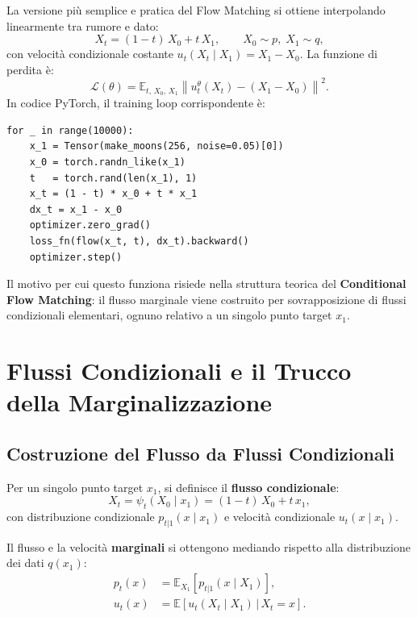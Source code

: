 La versione più semplice e pratica del Flow Matching si ottiene
interpolando linearmente tra rumore e dato:
\begin{equation}
  X_t = (1-t)\,X_0 + t\,X_1, \qquad X_0 \sim p,\; X_1 \sim q,
  \label{eq:fm-linear-interp}
\end{equation}
con velocità condizionale costante $u_t(X_t \mid X_1) = X_1 - X_0$.
La funzione di perdita è:
\begin{equation}
  \mathcal{L}(\theta) = \mathbb{E}_{t,\,X_0,\,X_1}\left\|
    u_t^\theta(X_t) - (X_1 - X_0)
  \right\|^2.
  \label{eq:fm-simple-loss}
\end{equation}
In codice PyTorch, il training loop corrispondente è:
\begin{verbatim}
for _ in range(10000):
    x_1 = Tensor(make_moons(256, noise=0.05)[0])
    x_0 = torch.randn_like(x_1)
    t   = torch.rand(len(x_1), 1)
    x_t = (1 - t) * x_0 + t * x_1
    dx_t = x_1 - x_0
    optimizer.zero_grad()
    loss_fn(flow(x_t, t), dx_t).backward()
    optimizer.step()
\end{verbatim}

Il motivo per cui questo funziona risiede nella struttura teorica del
\textbf{Conditional Flow Matching}: il flusso marginale viene costruito
per sovrapposizione di flussi condizionali elementari, ognuno relativo
a un singolo punto target $x_1$.

\section{Flussi Condizionali e il Trucco della Marginalizzazione}
\label{sec:fm-conditional-flows}

\subsection{Costruzione del Flusso da Flussi Condizionali}
\label{subsec:fm-conditional-construction}

Per un singolo punto target $x_1$, si definisce il \textbf{flusso
condizionale}:
\begin{equation}
  X_t = \psi_t(X_0 \mid x_1) = (1-t)\,X_0 + t\,x_1,
\end{equation}
con distribuzione condizionale $p_{t|1}(x \mid x_1)$ e velocità
condizionale $u_t(x \mid x_1)$.

Il flusso e la velocità \textbf{marginali} si ottengono mediando
rispetto alla distribuzione dei dati $q(x_1)$:
\begin{align}
  p_t(x) &= \mathbb{E}_{X_1}\!\left[p_{t|1}(x \mid X_1)\right], \\
  u_t(x) &= \mathbb{E}\!\left[u_t(X_t \mid X_1)\,\Big|\, X_t = x\right].
\end{align}

